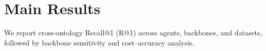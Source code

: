 \section{Main Results}
\label{sec-6}

We report cross-ontology Recall@1 (R@1) across agents, backbones, and datasets, followed by backbone sensitivity and cost--accuracy analysis.
